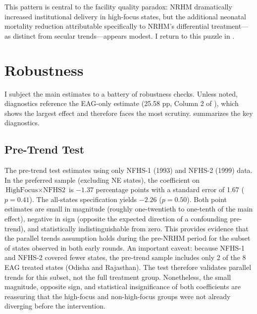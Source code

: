 \documentclass[12pt]{article}
\begin{document}
This pattern is central to the facility quality paradox: NRHM dramatically increased institutional delivery in high-focus states, but the additional neonatal mortality reduction attributable specifically to NRHM's differential treatment---as distinct from secular trends---appears modest. I return to this puzzle in .


\section{Robustness}
\label{sec:robustness}

I subject the main estimates to a battery of robustness checks. Unless noted, diagnostics reference the EAG-only estimate (25.58 pp, Column 2 of ), which shows the largest effect and therefore faces the most scrutiny.  summarizes the key diagnostics.



\subsection{Pre-Trend Test}

The pre-trend test estimates  using only NFHS-1 (1993) and NFHS-2 (1999) data. In the preferred sample (excluding NE states), the coefficient on $\text{HighFocus} \times \text{NFHS2}$ is $-1.37$ percentage points with a standard error of 1.67 ($p = 0.41$). The all-states specification yields $-2.26$ ($p = 0.50$). Both point estimates are small in magnitude (roughly one-twentieth to one-tenth of the main effect), negative in sign (opposite the expected direction of a confounding pre-trend), and statistically indistinguishable from zero. This provides evidence that the parallel trends assumption holds during the pre-NRHM period for the subset of states observed in both early rounds. An important caveat: because NFHS-1 and NFHS-2 covered fewer states, the pre-trend sample includes only 2 of the 8 EAG treated states (Odisha and Rajasthan). The test therefore validates parallel trends for this subset, not the full treatment group. Nonetheless, the small magnitude, opposite sign, and statistical insignificance of both coefficients are reassuring that the high-focus and non-high-focus groups were not already diverging before the intervention.
\end{document}
